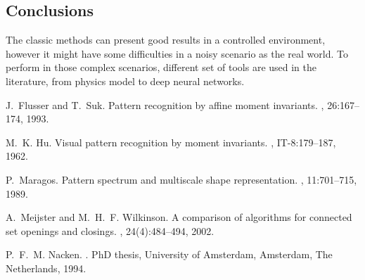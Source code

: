 \documentclass{sciposter}
\begin{document}
\begin{multicols}{3}
\section{Conclusions}

The classic methods can present good results in a controlled environment, however it might have some difficulties in a noisy scenario as the real world. To perform in those complex scenarios, different set of tools are used in the literature, from physics model to deep neural networks.




\begin{thebibliography}{1}

J.~Flusser and T.~Suk.
\newblock Pattern recognition by affine moment invariants.
, 26:167--174, 1993.

M.~K. Hu.
\newblock Visual pattern recognition by moment invariants.
, IT-8:179--187, 1962.

P.~Maragos.
\newblock Pattern spectrum and multiscale shape representation.
, 11:701--715, 1989.

A.~Meijster and M.~H.~F. Wilkinson.
\newblock A comparison of algorithms for connected set openings and closings.
, 24(4):484--494, 2002.

P.~F.~M. Nacken.
.
\newblock PhD thesis, University of Amsterdam, Amsterdam, The Netherlands,
  1994.

\end{thebibliography}

\end{multicols}
\end{document}
